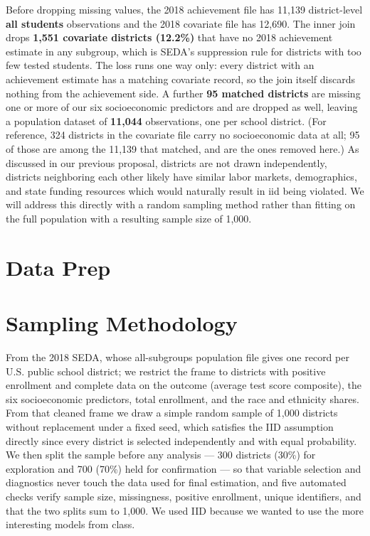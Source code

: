 \documentclass[
]{article}
\begin{document}
Before dropping missing values, the 2018 achievement file has 11,139
district-level \textbf{all students} observations and the 2018 covariate
file has 12,690. The inner join drops \textbf{1,551 covariate districts
(12.2\%)} that have no 2018 achievement estimate in any subgroup, which
is SEDA's suppression rule for districts with too few tested students.
The loss runs one way only: every district with an achievement estimate
has a matching covariate record, so the join itself discards nothing
from the achievement side. A further \textbf{95 matched districts} are
missing one or more of our six socioeconomic predictors and are dropped
as well, leaving a population dataset of \textbf{11,044} observations,
one per school district. (For reference, 324 districts in the covariate
file carry no socioeconomic data at all; 95 of those are among the
11,139 that matched, and are the ones removed here.) As discussed in our
previous proposal, districts are not drawn independently, districts
neighboring each other likely have similar labor markets, demographics,
and state funding resources which would naturally result in iid being
violated. We will address this directly with a random sampling method
rather than fitting on the full population with a resulting sample size
of 1,000.

\section{Data Prep}\label{data-prep}

\section{Sampling Methodology}\label{sampling-methodology}

From the 2018 SEDA, whose all-subgroups population file gives one record
per U.S. public school district; we restrict the frame to districts with
positive enrollment and complete data on the outcome (average test score
composite), the six socioeconomic predictors, total enrollment, and the
race and ethnicity shares. From that cleaned frame we draw a simple
random sample of 1,000 districts without replacement under a fixed seed,
which satisfies the IID assumption directly since every district is
selected independently and with equal probability. We then split the
sample before any analysis --- 300 districts (30\%) for exploration and
700 (70\%) held for confirmation --- so that variable selection and
diagnostics never touch the data used for final estimation, and five
automated checks verify sample size, missingness, positive enrollment,
unique identifiers, and that the two splits sum to 1,000. We used IID
because we wanted to use the more interesting models from class.
\end{document}
